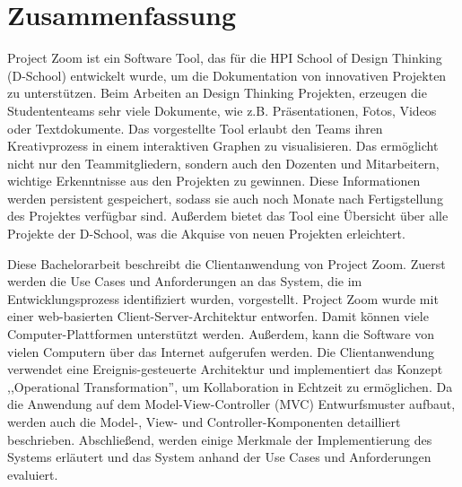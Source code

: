\chapter*{Zusammenfassung}
\hypertarget{abstract_de}{}

Project Zoom ist ein Software Tool, das für die HPI School of Design Thinking (D-School) entwickelt wurde, um die Dokumentation von innovativen Projekten zu unterstützen. Beim Arbeiten an Design Thinking Projekten, erzeugen die Studententeams sehr viele Dokumente, wie z.B. Präsentationen, Fotos, Videos oder Textdokumente. Das vorgestellte Tool erlaubt den Teams ihren Kreativprozess in einem interaktiven Graphen zu visualisieren. Das ermöglicht nicht nur den Teammitgliedern, sondern auch den Dozenten und Mitarbeitern, wichtige Erkenntnisse aus den Projekten zu gewinnen. Diese Informationen werden persistent gespeichert, sodass sie auch noch Monate nach Fertigstellung des Projektes verfügbar sind. Außerdem bietet das Tool eine Übersicht über alle Projekte der D-School, was die Akquise von neuen Projekten erleichtert.

Diese Bachelorarbeit beschreibt die Clientanwendung von Project Zoom. Zuerst werden die Use Cases und Anforderungen an das System, die im Entwicklungsprozess identifiziert wurden, vor\-ge\-stellt. Project Zoom wurde mit einer web-basierten Client-Server-Architektur entworfen. Damit können viele Computer-Plattformen unterstützt werden. Außerdem, kann die Software von vielen Computern über das Internet aufgerufen werden. Die Clientanwendung verwendet eine Ereignis-gesteuerte Architektur und implementiert das Konzept ,,Operational Transformation'', um Kollaboration in Echtzeit zu er\-mö\-glich\-en. Da die Anwendung auf dem Model-View-Controller (MVC) Entwurfsmuster aufbaut, werden auch die Model-, View- und Controller-Komponenten detailliert be\-schrie\-ben. Abschließend, werden einige Merkmale der Implementierung des Systems erläutert und das System anhand der Use Cases und Anforderungen evaluiert.